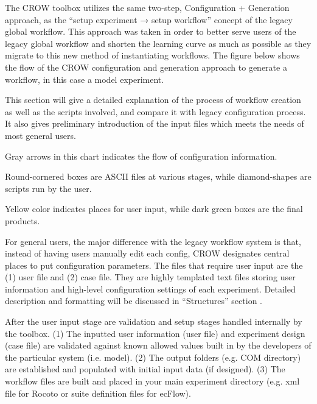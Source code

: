 The C\-R\-O\-W toolbox utilizes the same two-\/step, Configuration + Generation approach, as the “setup experiment → setup workflow” concept of the legacy global workflow. This approach was taken in order to better serve users of the legacy global workflow and shorten the learning curve as much as possible as they migrate to this new method of instantiating workflows. The figure below shows the flow of the C\-R\-O\-W configuration and generation approach to generate a workflow, in this case a model experiment.

This section will give a detailed explanation of the process of workflow creation as well as the scripts involved, and compare it with legacy configuration process. It also gives preliminary introduction of the input files which meets the needs of most general users.




\begin{DoxyItemize}
\item Gray arrows in this chart indicates the flow of configuration information.
\item Round-\/cornered boxes are A\-S\-C\-I\-I files at various stages, while diamond-\/shapes are scripts run by the user.
\item Yellow color indicates places for user input, while dark green boxes are the final products.
\end{DoxyItemize}

For general users, the major difference with the legacy workflow system is that, instead of having users manually edit each config, C\-R\-O\-W designates central places to put configuration parameters. The files that require user input are the (1) user file and (2) case file. They are highly templated text files storing user information and high-\/level configuration settings of each experiment. Detailed description and formatting will be discussed in “\-Structures” section .

After the user input stage are validation and setup stages handled internally by the toolbox. (1) The inputted user information (user file) and experiment design (case file) are validated against known allowed values built in by the developers of the particular system (i.\-e. model). (2) The output folders (e.\-g. C\-O\-M directory) are established and populated with initial input data (if designed). (3) The workflow files are built and placed in your main experiment directory (e.\-g. xml file for Rocoto or suite definition files for ec\-Flow).

